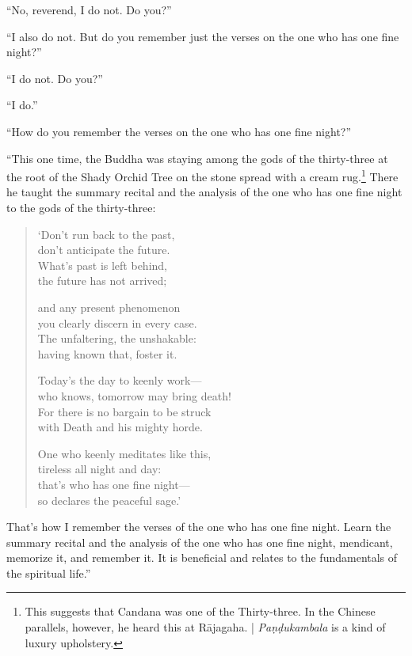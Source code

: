\documentclass[12pt,openany]{book}%
\begin{document}
“No, reverend, I do not. Do you?” 

“I also do not. But do you remember just the verses on the one who has one fine night?” 

“I do not. Do you?” 

“I do.” 

“How do you remember the verses on the one who has one fine night?” 

“This one time, the Buddha was staying among the gods of the thirty-three at the root of the Shady Orchid Tree on the stone spread with a cream rug.\footnote{This suggests that Candana was one of the Thirty-three. In the Chinese parallels, however, he heard this at \textsanskrit{Rājagaha}. | \textit{\textsanskrit{Paṇḍukambala}} is a kind of luxury upholstery. } There he taught the summary recital and the analysis of the one who has one fine night to the gods of the thirty-three: 

\begin{verse}%
‘Don’t run back to the past, \\
don’t anticipate the future. \\
What’s past is left behind, \\
the future has not arrived; 

and any present phenomenon \\
you clearly discern in every case. \\
The unfaltering, the unshakable: \\
having known that, foster it. 

Today’s the day to keenly work—\\
who knows, tomorrow may bring death! \\
For there is no bargain to be struck \\
with Death and his mighty horde. 

One who keenly meditates like this, \\
tireless all night and day: \\
that’s who has one fine night—\\
so declares the peaceful sage.’ 

%
\end{verse}

That’s how I remember the verses of the one who has one fine night. Learn the summary recital and the analysis of the one who has one fine night, mendicant, memorize it, and remember it. It is beneficial and relates to the fundamentals of the spiritual life.” 
\end{document}
